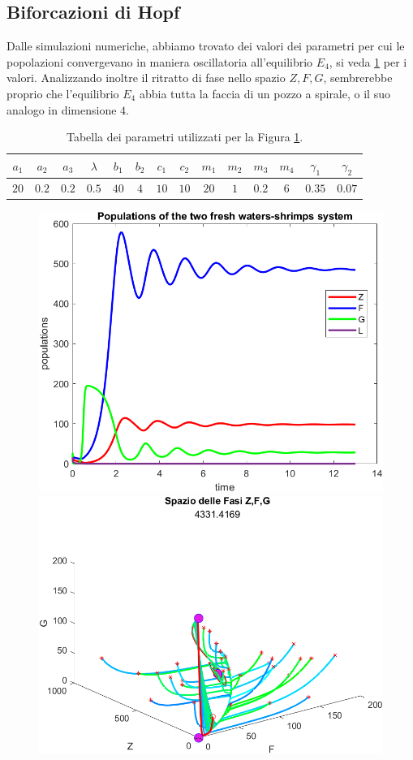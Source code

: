 \documentclass[12pt,a4paper]{article}
\numberwithin{theorem}{section}
\numberwithin{definition}{section}
\numberwithin{example}{section}
\begin{document}
\subsection{Biforcazioni di Hopf}
Dalle simulazioni numeriche, abbiamo trovato dei valori dei parametri per cui le popolazioni convergevano in maniera oscillatoria all'equilibrio $E_4$, si veda \ref{tab_hopf} per i valori. 
Analizzando inoltre il ritratto di fase nello spazio $Z,F,G$, sembrerebbe proprio che l'equilibrio $E_4$ abbia tutta la faccia di un pozzo a spirale, o il suo analogo in dimensione $4$.
\begin{table}[h!]
\centering
 \begin{tabular}{|c|c|c|c|c|c|c|c|c|c|c|c|c|c|}
 \hline
  $a_1$ & $a_2$ & $a_3$ & $\lambda$ & $b_1$ & $b_2$ & $c_1$  & $c_2$ & $m_1$ & $m_2$ & $m_3$ & $m_4$ & $\gamma_1$ & $\gamma_2$\\
  \hline
  $20$ & $0.2$ & $0.2$ & $0.5$ & $40$ & $4$ & $10$ &  $10$ & $20$ & $1$ & $0.2$ & $6$ & $0.35$ & $0.07$ \\
  \hline
 \end{tabular}
 \caption{Tabella dei parametri utilizzati per la Figura \ref{hopf1}.}
 \label{tab_hopf}
\end{table}

\begin{figure}[h!]
    \centering
    \includegraphics[width=8 cm]{grafici/hopf_prima_popolazioni.png} 
    \includegraphics[width=8 cm]{grafici/hopf_prima_fasi.png}
    \label{hopf1}
\end{figure}
\end{document}

